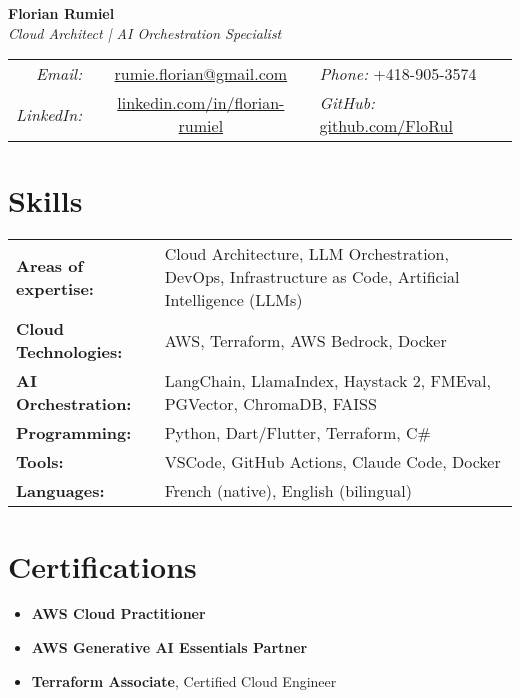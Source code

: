 ﻿\documentclass[11pt,letterpaper]{article}
\begin{document}
\begin{center}
  {\LARGE\textbf{Florian Rumiel}} \\[0.3em]
  {\large\textit{Cloud Architect | AI Orchestration Specialist}} \\[0.5em]
  \begin{tabular}{r c l}
    \textit{Email:} & \href{mailto:rumie.florian@gmail.com}{rumie.florian@gmail.com} & \textit{Phone:} +418-905-3574 \\
    \textit{LinkedIn:} & \href{https://linkedin.com/in/florian-rumiel}{linkedin.com/in/florian-rumiel} & \textit{GitHub:} \href{https://github.com/FloRul}{github.com/FloRul} \\
  \end{tabular}
\end{center}

\section*{Skills}
\begin{tabularx}{\textwidth}{@{}l X@{}}
\textbf{Areas of expertise:} & Cloud Architecture, LLM Orchestration, DevOps, Infrastructure as Code, Artificial Intelligence (LLMs) \\[0.2em]
\textbf{Cloud Technologies:} & AWS, Terraform, AWS Bedrock, Docker \\[0.2em]
\textbf{AI Orchestration:} & LangChain, LlamaIndex, Haystack 2, FMEval, PGVector, ChromaDB, FAISS \\[0.2em]
\textbf{Programming:} & Python, Dart/Flutter, Terraform, C\# \\[0.2em]
\textbf{Tools:} & VSCode, GitHub Actions, Claude Code, Docker \\[0.2em]
\textbf{Languages:} & French (native), English (bilingual) \\
\end{tabularx}

\section*{Certifications}
\begin{itemize}[leftmargin=1.5em]
  \item \textbf{AWS Cloud Practitioner}
  \item \textbf{AWS Generative AI Essentials Partner}
  \item \textbf{Terraform Associate}, Certified Cloud Engineer
\end{itemize}
\end{document}
